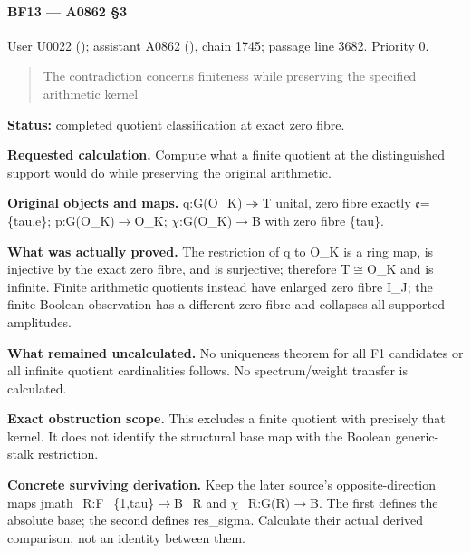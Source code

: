 \paragraph{BF13 --- A0862 §3}\label{bf13-a0862-3}

User U0022 (\protect{});
assistant A0862 (\protect{}),
chain 1745; passage line 3682. Priority 0.

\begin{quote}
The contradiction concerns finiteness while preserving the specified
arithmetic kernel
\end{quote}

\textbf{Status:} completed quotient classification at exact zero fibre.

\textbf{Requested calculation.} Compute what a finite quotient at the
distinguished support would do while preserving the original arithmetic.

\textbf{Original objects and maps.}
q:G(O\_K)\allowbreak{}\ensuremath{↠}\allowbreak{}T unital, zero fibre
exactly \allowbreak{}\ensuremath{𝔢}\allowbreak{}=\{tau,e\};
p:G(O\_K)\allowbreak{}\ensuremath{→}\allowbreak{}O\_K;
\allowbreak{}\ensuremath{χ}\allowbreak{}:G(O\_K)\allowbreak{}\ensuremath{→}\allowbreak{}B
with zero fibre \{tau\}.

\textbf{What was actually proved.} The restriction of q to O\_K is a
ring map, is injective by the exact zero fibre, and is surjective;
therefore T\allowbreak{}\ensuremath{≅}\allowbreak{}O\_K and is infinite.
Finite arithmetic quotients instead have enlarged zero fibre I\_J; the
finite Boolean observation has a different zero fibre and collapses all
supported amplitudes.

\textbf{What remained uncalculated.} No uniqueness theorem for all F1
candidates or all infinite quotient cardinalities follows. No
spectrum/weight transfer is calculated.

\textbf{Exact obstruction scope.} This excludes a finite quotient with
precisely that kernel. It does not identify the structural base map with
the Boolean generic-stalk restriction.

\textbf{Concrete surviving derivation.} Keep the later source's
opposite-direction maps
jmath\_R:F\_\{1,tau\}\allowbreak{}\ensuremath{→}\allowbreak{}B\_R and
\allowbreak{}\ensuremath{χ}\allowbreak{}\_R:G(R)\allowbreak{}\ensuremath{→}\allowbreak{}B.
The first defines the absolute base; the second defines res\_sigma.
Calculate their actual derived comparison, not an identity between them.

